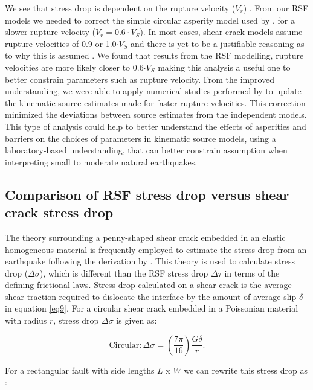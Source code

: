 \documentclass[draft]{agujournal2019}
\begin{document}
We see that stress drop is dependent on the rupture velocity ($V_{r}$) \cite{Kaneko2015}. From our RSF models we needed to correct the simple circular asperity model used by , for a slower rupture velocity ($V_{r} = 0.6\cdot V_{S}$).  In most cases, shear crack models assume rupture velocities of 0.9 or 1.0$\cdot V_{S}$ and there is yet to be a justifiable reasoning as to why this is assumed \cite{Cocco2016, Selvadurai2019}. We found that results from the RSF modelling, rupture velocities are more likely closer to 0.6$\cdot V_{S}$ making this analysis a useful one to better constrain parameters such as rupture velocity. From the improved understanding, we were able to apply numerical studies performed by  to update the kinematic source estimates made for faster rupture velocities.  This correction minimized the deviations between source estimates from the independent models. This type of analysis could help to better understand the effects of asperities and barriers on the choices of parameters in kinematic source models, using a laboratory-based understanding, that can better constrain assumption when interpreting small to moderate natural earthquakes.

\subsection{Comparison of RSF stress drop versus shear crack stress drop}
\label{RSFvEshelby}
The theory surrounding a penny-shaped shear crack embedded in an elastic homogeneous material is frequently employed to estimate the stress drop from an earthquake following the derivation by . This theory is used to calculate stress drop ($\Delta\sigma$), which is different than the RSF stress drop $\Delta\tau$ in terms of the defining frictional laws. Stress drop calculated on a shear crack is the average shear traction required to dislocate the interface by the amount of average slip $\delta$ in equation \eqref{eq9}. For a circular shear crack embedded in a Poissonian material with radius $r$, stress drop $\Delta\sigma$ is given as: 

\begin{equation}
\text{Circular}: \Delta\sigma = \left(\frac{7\pi}{16}\right) \frac{G \delta}{r}.  
\label{eq10}
\end{equation}

\noindent For a rectangular fault with side lengths $L$ x $W$ we can rewrite this stress drop as \cite<Appendix A,>[]{Kato2003}:
\end{document}
